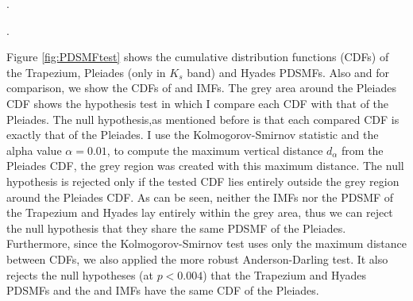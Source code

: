 \begin{figure*}[htp]
\begin{center}
\caption{Left: PDSMFs of the Pleiades (derived here for $J,H,K_s$ bands), Trapezium, and Hyades, from \citet{Bouy2015}. They are normalised in the interval of completeness.}
\label{fig:PDSMFcomparison}.
\end{center}
\end{figure*}

\begin{figure*}[htp]
\begin{center}
\caption{Cumulative distribution functions (CDF) of the PDSMFs from left panel and that of \citet{Chabrier2005} and \citet{Thies2007} system initial mass function (normalised also in the interval of completeness). The Pleiades CDF shown is just from $K_s$ band. The grey area depicts the area in which the null hypothesis of same PDSMF as that of the Pleiades can not be rejected (at $\alpha=0.01$).}
\label{fig:PDSMFtest}.
\end{center}
\end{figure*}


Figure \ref{fig:PDSMFtest} shows the cumulative distribution functions (CDFs) of the Trapezium, Pleiades (only in $K_s$ band) and Hyades PDSMFs. Also and for comparison, we show the CDFs of \citet{Chabrier2005} and \citet{Thies2007} IMFs. The grey area around the Pleiades CDF shows the hypothesis test in which I compare each CDF with that of the Pleiades. The null hypothesis,as mentioned before is that each compared CDF is exactly that of the Pleiades. I use the Kolmogorov-Smirnov statistic and the alpha value $\alpha = 0.01$, to compute the maximum vertical distance $d_{\alpha}$ from the Pleiades CDF, the grey region was created with this maximum distance. The null hypothesis is rejected only if the tested CDF lies entirely outside the grey region around the Pleiades CDF. As can be seen, neither the IMFs nor the PDSMF of the Trapezium and Hyades lay entirely within the grey area, thus we can reject the null hypothesis that they share the same PDSMF of the Pleiades. Furthermore, since the Kolmogorov-Smirnov test uses only the maximum distance between CDFs, we also applied the more robust Anderson-Darling test. It also rejects the null hypotheses (at $p < 0.004$) that the Trapezium and Hyades PDSMFs and the \citet{Chabrier2005} and \citet{Thies2007} IMFs have the same CDF of the Pleiades. 

